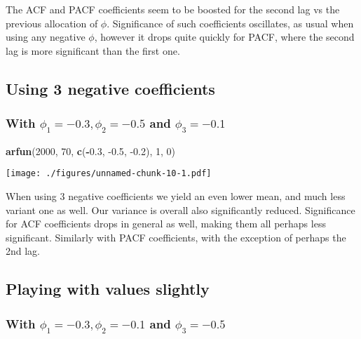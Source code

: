 \documentclass[]{article}
\newenvironment{Shaded}{\begin{snugshade}}{\end{snugshade}}
\newcommand{\DecValTok}[1]{\textcolor[rgb]{0.00,0.00,0.81}{#1}}
\newcommand{\FloatTok}[1]{\textcolor[rgb]{0.00,0.00,0.81}{#1}}
\newcommand{\KeywordTok}[1]{\textcolor[rgb]{0.13,0.29,0.53}{\textbf{#1}}}
\newcommand{\NormalTok}[1]{#1}
\newcommand{\OperatorTok}[1]{\textcolor[rgb]{0.81,0.36,0.00}{\textbf{#1}}}
\begin{document}
The ACF and PACF coefficients seem to be boosted for the second lag vs
the previous allocation of \(\phi\). Significance of such coefficients
oscillates, as usual when using any negative \(\phi\), however it drops
quite quickly for PACF, where the second lag is more significant than
the first one.

\hypertarget{using-3-negative-coefficients}{%
\subsection{Using 3 negative
coefficients}\label{using-3-negative-coefficients}}

\hypertarget{with-phi_1--0.3-phi_2--0.5-and-phi_3--0.1}{%
\subsubsection{\texorpdfstring{With \(\phi_1 = -0.3, \phi_2 = -0.5\) and
\(\phi_3 = -0.1\)}{With \textbackslash{}phi\_1 = -0.3, \textbackslash{}phi\_2 = -0.5 and \textbackslash{}phi\_3 = -0.1}}\label{with-phi_1--0.3-phi_2--0.5-and-phi_3--0.1}}

\begin{Shaded}
\begin{Highlighting}[]
\KeywordTok{arfun}\NormalTok{(}\DecValTok{2000}\NormalTok{, }\DecValTok{70}\NormalTok{, }\KeywordTok{c}\NormalTok{(}\OperatorTok{-}\FloatTok{0.3}\NormalTok{, }\FloatTok{-0.5}\NormalTok{, }\FloatTok{-0.2}\NormalTok{), }\DecValTok{1}\NormalTok{, }\DecValTok{0}\NormalTok{)}
\end{Highlighting}
\end{Shaded}

\texttt{[image: ./figures/unnamed-chunk-10-1.pdf]}

When using 3 negative coefficients we yield an even lower mean, and much
less variant one as well. Our variance is overall also significantly
reduced. Significance for ACF coefficients drops in general as well,
making them all perhaps less significant. Similarly with PACF
coefficients, with the exception of perhaps the 2nd lag.

\hypertarget{playing-with-values-slightly}{%
\subsection{Playing with values
slightly}\label{playing-with-values-slightly}}

\hypertarget{with-phi_1--0.3-phi_2--0.1-and-phi_3--0.5}{%
\subsubsection{\texorpdfstring{With \(\phi_1 = -0.3, \phi_2 = -0.1\) and
\(\phi_3 = -0.5\)}{With \textbackslash{}phi\_1 = -0.3, \textbackslash{}phi\_2 = -0.1 and \textbackslash{}phi\_3 = -0.5}}\label{with-phi_1--0.3-phi_2--0.1-and-phi_3--0.5}}
\end{document}

